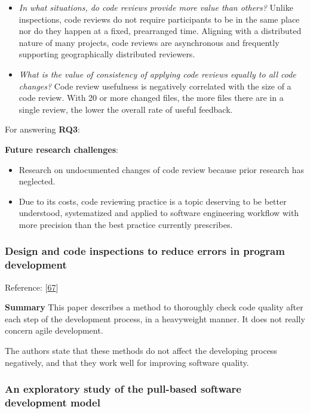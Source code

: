 \documentclass[]{book}
\providecommand{\tightlist}{%
  \setlength{\itemsep}{0pt}\setlength{\parskip}{0pt}}
\begin{document}
\begin{itemize}
\tightlist
\item
  \emph{In what situations, do code reviews provide more value than
  others?} Unlike inspections, code reviews do not require participants
  to be in the same place nor do they happen at a fixed, prearranged
  time. Aligning with a distributed nature of many projects, code
  reviews are asynchronous and frequently supporting geographically
  distributed reviewers.
\item
  \emph{What is the value of consistency of applying code reviews
  equally to all code changes?} Code review usefulness is negatively
  correlated with the size of a code review. With 20 or more changed
  files, the more files there are in a single review, the lower the
  overall rate of useful feedback.
\end{itemize}

For answering \textbf{RQ3}:

\textbf{Future research challenges}:

\begin{itemize}
\item
  Research on undocumented changes of code review because prior research
  has neglected.
\item
  Due to its costs, code reviewing practice is a topic deserving to be
  better understood, systematized and applied to software engineering
  workflow with more precision than the best practice currently
  prescribes.
\end{itemize}

\subsubsection{Design and code inspections to reduce errors in program
development}\label{design-and-code-inspections-to-reduce-errors-in-program-development}

Reference: {[}\protect\hyperlink{ref-fagan2002design}{67}{]}

\textbf{Summary} This paper describes a method to thoroughly check code
quality after each step of the development process, in a heavyweight
manner. It does not really concern agile development.

The authors state that these methods do not affect the developing
process negatively, and that they work well for improving software
quality.

\subsubsection{An exploratory study of the pull-based software
development
model}\label{an-exploratory-study-of-the-pull-based-software-development-model}
\end{document}
